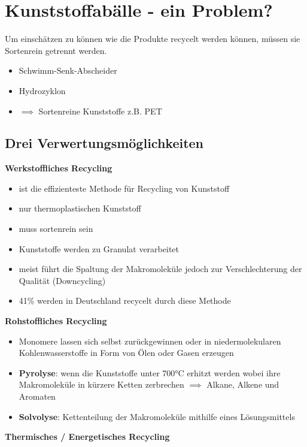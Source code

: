 
\section{Kunststoffabälle - ein Problem?}
Um einschätzen zu können wie die Produkte recycelt werden können,
müssen sie Sortenrein getrennt werden.
\begin{itemize}
    \item Schwimm-Senk-Abscheider
    \item Hydrozyklon
    \item $\implies$ Sortenreine Kunststoffe z.B. PET
\end{itemize}

\subsection{Drei Verwertungsmöglichkeiten}

\textbf{Werkstoffliches Recycling} 
\begin{itemize}
    \item ist die effizienteste Methode für Recycling von Kunststoff
    \item nur thermoplastischen Kunststoff
    \item muss sortenrein sein
    \item Kunststoffe werden zu Granulat verarbeitet
    \item meist führt die Spaltung der Makromoleküle jedoch zur Verschlechterung der Qualität (Downcycling)
    \item 41\% werden in Deutschland recycelt durch diese Methode
\end{itemize}

\vspace{0.5cm}

\textbf{Rohstoffliches Recycling} 

\begin{itemize}
    \item Monomere lassen sich selbst zurückgewinnen oder in niedermolekularen Kohlenwasserstoffe in Form von Ölen oder Gasen erzeugen
    \item \textbf{Pyrolyse}: wenn die Kunststoffe unter 700°C erhitzt werden wobei ihre Makromoleküle in kürzere Ketten zerbrechen $\implies$ Alkane, Alkene und Aromaten
    \item \textbf{Solvolyse}: Kettenteilung der Makromoleküle mithilfe eines Lösungsmittels
\end{itemize}

\vspace{0.5cm}

\textbf{Thermisches / Energetisches Recycling}

